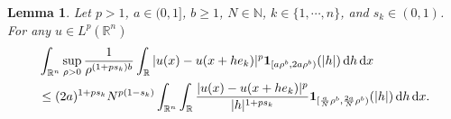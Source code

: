 \documentclass[11pt]{amsart}
\theoremstyle{plain}
\newtheorem{lemma}[theorem]{Lemma}
\theoremstyle{definition}
\numberwithin{equation}{section}
\begin{document}
\begin{lemma} \label{lem:cv}
Let $p >1$, $a \in (0,1]$, $b\geq 1$, $N \in \mathbb{N}$, $k \in \lbrace 1,\cdots, n \rbrace$, and $s_k \in (0,1)$. 
For any $u \in L^p(\mathbb{R}^n)$
\begin{equation*}
\begin{split}
&\int_{\mathbb{R}^n} \sup_{\rho > 0} \frac{1}{\rho^{(1+ps_k)b}} \int_{\mathbb{R}} |u(x) - u(x+he_k)|^p {\bf 1}_{[a\rho^{b},2a\rho^{b})} (|h|) \,\mathrm{d}h \,\mathrm{d}x \\
&\leq (2a)^{1+ps_k} N^{p(1-s_k)} \int_{\mathbb{R}^n} \int_{\mathbb{R}} \frac{|u(x) - u(x+he_k)|^p}{|h|^{1+ps_k}} {\bf 1}_{[\frac{a}{N}\rho^{b}, \frac{2a}{N}\rho^{b})} (|h|) \,\mathrm{d}h\,\mathrm{d}x.
\end{split}
\end{equation*}
\end{lemma}
\end{document}
